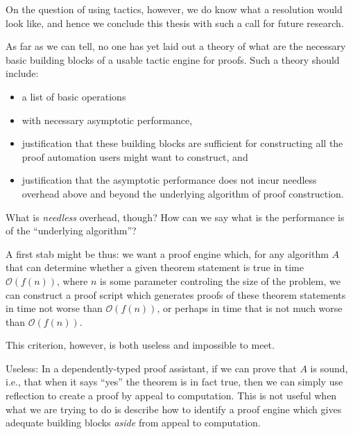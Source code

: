On the question of using tactics, however, we do know what a resolution would look like, and hence we conclude this thesis with such a call for future research.

As far as we can tell, no one has yet laid out a theory of what are the necessary basic building blocks of a usable tactic engine for proofs.
Such a theory should include:
\begin{itemize}
\item
  a list of basic operations
\item
  with necessary asymptotic performance,
\item
  justification that these building blocks are sufficient for constructing all the proof automation users might want to construct, and
\item
  justification that the asymptotic performance does not incur needless overhead above and beyond the underlying algorithm of proof construction.
\end{itemize}

What is \emph{needless} overhead, though?
How can we say what is the performance is of the ``underlying algorithm''?

A first stab might be thus: we want a proof engine which, for any algorithm $A$ that can determine whether a given theorem statement is true in time $\mathcal O(f(n))$, where $n$ is some parameter controling the size of the problem, we can construct a proof script which generates proofs of these theorem statements in time not worse than $\mathcal O(f(n))$, or perhaps in time that is not much worse than $\mathcal O(f(n))$.

This criterion, however, is both useless and impossible to meet.

Useless:
In a dependently-typed proof assistant, if we can prove that $A$ is sound, i.e., that when it says ``yes'' the theorem is in fact true, then we can simply use reflection to create a proof by appeal to computation.
This is not useful when what we are trying to do is describe how to identify a proof engine which gives adequate building blocks \emph{aside} from appeal to computation.

